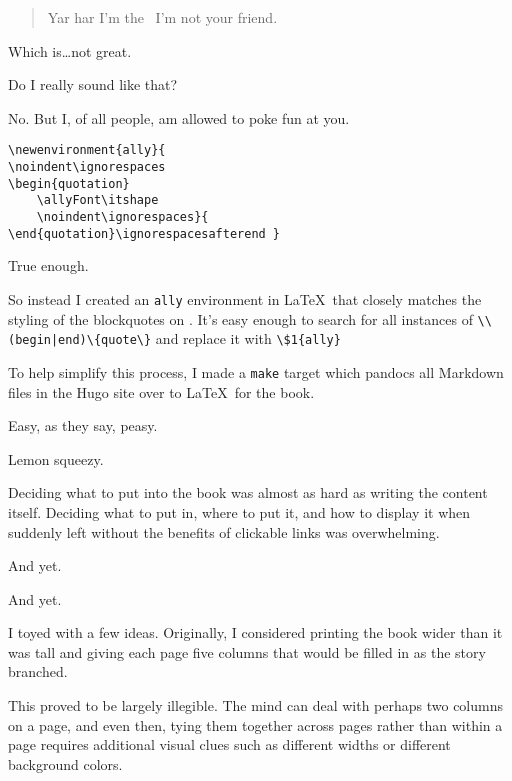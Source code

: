 \begin{paracol}{2}
\begin{leftcolumn}
\begin{quote}
  Yar har I'm the \allyWord\ I'm not your friend.
\end{quote}
Which is\ldots{}not great.

\begin{ally}
  Do I really sound like that?
\end{ally}
No. But I, of all people, am allowed to poke fun at you.
\end{leftcolumn}
\begin{rightcolumn*}
\begin{verbatim}
\newenvironment{ally}{
\noindent\ignorespaces
\begin{quotation}
    \allyFont\itshape
    \noindent\ignorespaces}{
\end{quotation}\ignorespacesafterend }
\end{verbatim}
\end{rightcolumn*}
\begin{leftcolumn}

\begin{ally}
  True enough.
\end{ally}
So instead I created an \texttt{ally} environment in \LaTeX\ that closely matches the styling of the blockquotes on \allyId. It's easy enough to search for all instances of \texttt{\textbackslash\textbackslash(begin|end)\textbackslash\{quote\textbackslash\}} and replace it with \texttt{\textbackslash\$1\{ally\}}

To help simplify this process, I made a \texttt{make} target which pandocs all Markdown files in the Hugo site over to \LaTeX\ for the book. 

\begin{ally}
  Easy, as they say, peasy.
\end{ally}
Lemon squeezy.

Deciding what to put into the book was almost as hard as writing the content itself. Deciding what to put in, where to put it, and how to display it when suddenly left without the benefits of clickable links was overwhelming.

\begin{ally}
  And yet.
\end{ally}
And yet.

I toyed with a few ideas. Originally, I considered printing the book wider than it was tall and giving each page five columns that would be filled in as the story branched.

This proved to be largely illegible. The mind can deal with perhaps two columns on a page, and even then, tying them together across pages rather than within a page requires additional visual clues such as different widths or different background colors.


\end{leftcolumn}
\end{paracol}
